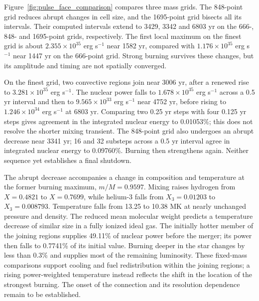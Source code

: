 \documentclass[11pt,letterpaper]{article}
\begin{document}
Figure~\ref{fig:pulse_face_comparison} compares three mass grids. The
848-point grid reduces abrupt changes in cell size, and the 1695-point grid
bisects all its intervals. Their computed intervals extend to 3429, 3342
and 6803 yr on the 666-, 848- and 1695-point grids, respectively.
The first local maximum on the finest grid is about
$2.355\times10^{35}$ erg s$^{-1}$ near 1582 yr, compared with
$1.176\times10^{35}$ erg s$^{-1}$ near 1447 yr on the 666-point grid.
Strong burning survives these changes, but its amplitude and timing
are not spatially converged.

On the finest grid, two convective regions join near 3006 yr, after a
renewed rise to $3.281\times10^{35}$ erg s$^{-1}$. The nuclear power falls
to $1.678\times10^{35}$ erg s$^{-1}$ across a 0.5 yr interval and then to
$9.565\times10^{33}$ erg s$^{-1}$ near 4752 yr, before rising to
$1.246\times10^{34}$ erg s$^{-1}$ at 6803 yr. Comparing two
0.25 yr steps with four 0.125 yr steps gives agreement in the integrated
nuclear energy to 0.01053\%; this does not resolve the shorter mixing
transient. The 848-point grid also undergoes an abrupt decrease near
3341 yr; 16 and 32 substeps across a 0.5 yr interval agree in integrated
nuclear energy to 0.09760\%. Burning then strengthens again. Neither
sequence yet establishes a final shutdown.

The abrupt decrease accompanies a change in composition and temperature
at the former burning maximum, $m/M=0.9597$. Mixing raises hydrogen from
$X=0.4821$ to $X=0.7699$, while helium-3 falls from $X_3=0.01203$ to
$X_3=0.008793$. Temperature falls from 13.25 to 10.38 MK at nearly
unchanged pressure and density. The reduced mean molecular weight predicts
a temperature decrease of similar size in a fully ionized ideal gas.
The initially hotter member of the joining regions supplies 49.11\% of
nuclear power before the merger; its power then falls to 0.7741\% of its
initial value. Burning deeper in the star changes by less than 0.3\%
and supplies most of the remaining luminosity. These fixed-mass comparisons
support cooling and fuel redistribution within the joining regions;
a rising power-weighted temperature instead reflects the shift in the
location of the strongest burning. The onset of the connection and its
resolution dependence remain to be established.
\end{document}

